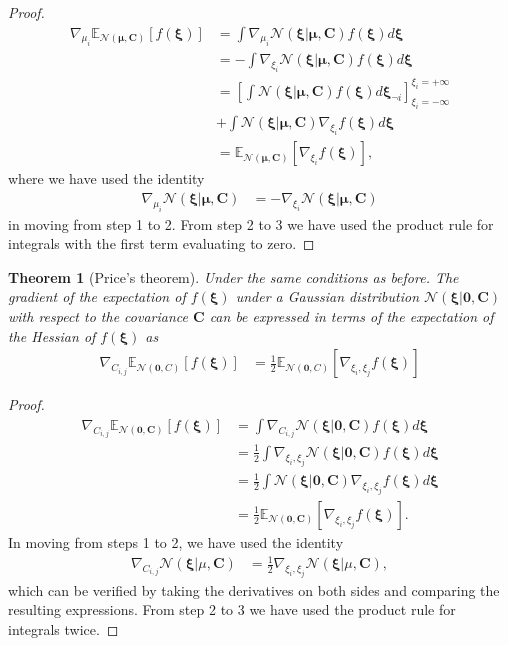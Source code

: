 \documentclass{article}
\newcommand{\E}{\mathbb{E}} %
\newcommand{\N}{\mathcal{N}} %
\newcommand{\myvec}[1]{\mbox{$\mathbf{#1}$}}
\newcommand{\myvecsym}[1]{\mbox{$\boldsymbol{#1}$}}
\newcommand{\vzero}{\mbox{$\myvecsym{0}$}}
\newcommand{\vmu}{\mbox{$\myvecsym{\mu}$}}
\newcommand{\vxi}{\mbox{$\myvecsym{\xi}$}}
\newcommand{\vC}{\mbox{$\myvec{C}$}}
\newtheorem{theorem}{Theorem}[section]
\begin{document}
\begin{bibunit}[icml2013]
\begin{proof}
\begin{align}
\nabla_{\mu_i} \E_{ \N(\vmu,\vC) } \left[ f(\vxi) \right ] &=  \int \nabla_{\mu_i} 
\N(\vxi| 
\vmu,\vC)  f(\vxi) d\vxi \nonumber \\
&= -\int \nabla_{\xi_i} 
\N(\vxi| 
\vmu,\vC)  f(\vxi) d\vxi \nonumber  \\
&= \left[ \int  \N(\vxi| 
\vmu,\vC) f(\vxi) d \vxi_{\neg i} \right]_{ \xi_i = -\infty }^{\xi_i =  + \infty} 
\nonumber \\
&+  \int 
\N(\vxi| 
\vmu,\vC) \nabla_{\xi_i}   f(\vxi) d\vxi \nonumber  \\
&= \E_{ \N(\vmu,\vC) } 
\left[
\nabla_{\xi_i} f(\vxi) \right],
\end{align}
where we have used the identity
\begin{align}
\nabla_{\mu_i} \N(\vxi| \vmu,\vC) &= - \nabla_{\xi_i} 
\N(\vxi| \vmu,\vC) \nonumber 
\end{align}
in moving from step 1 to 2. From step 2 to 3 we have used the product 
rule for integrals with the first term evaluating to zero.
\end{proof}


\begin{theorem}[Price's theorem]
Under the same conditions as before. The gradient of the expectation of 
$f(\vxi)$ under a Gaussian 
distribution $\mathcal{N}(\vxi| \vzero,\vC)$ with respect to the covariance 
$\vC$ can be expressed in terms of the 
expectation of the Hessian of $f(\vxi)$ as 
\begin{align}
\nabla_{C_{i,j}} \E_{ \N(\vzero,C) } \left[ f(\vxi) \right ] &=  \frac{1}{2} \E_{ 
\N(\vzero,C) } 
\left[
\nabla_{\xi_i, \xi_j} f(\vxi) \right] \nonumber
\end{align}
\end{theorem}

\begin{proof}
\begin{align}
\nabla_{C_{i,j}} \E_{ \N(\vzero,\vC) } \left[ f(\vxi) \right ] &=  \int 
\nabla_{C_{i,j}} 
\N(\vxi| \vzero,\vC)  f(\vxi) d\vxi \nonumber \\
&= \frac{1}{2} \int \nabla_{\xi_i, \xi_j}
\N(\vxi| \vzero,\vC)  f(\vxi) d\vxi \nonumber \\
&= \frac{1}{2} \int 
\N(\vxi| \vzero,\vC)  \nabla_{\xi_i, \xi_j} f(\vxi) d\vxi \nonumber \\
&=  \frac{1}{2} \E_{ 
\N(\vzero,\vC) } 
\left[
\nabla_{\xi_i, \xi_j} f(\vxi) \right].
\end{align}
In moving from steps 1 to 2, we have used the identity
\begin{align}
\nabla_{C_{i,j}} \N(\vxi| \mu,\vC) &= \frac{1}{2} \nabla_{\xi_i, \xi_j} 
\N(\vxi| \mu,\vC), \nonumber 
\end{align}
which can be verified by taking the derivatives on both sides and comparing 
the resulting expressions. From step 2 to 3 we have used the 
product 
rule for integrals twice.
\end{proof}


\end{bibunit}
\end{document}
